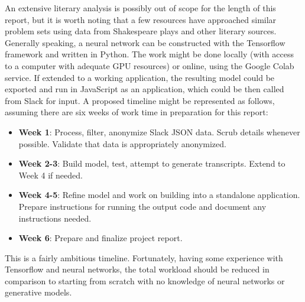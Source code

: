 \documentclass[11pt]{article}
\begin{document}
An extensive literary analysis is possibly out of scope for the length of this report, but it is worth noting that a few resources have approached similar problem sets using data from Shakespeare plays and other literary sources.
Generally speaking, a neural network can be constructed with the Tensorflow framework and written in Python.
The work might be done locally (with access to a computer with adequate GPU resources) or online, using the Google Colab service.
If extended to a working application, the resulting model could be exported and run in JavaScript as an application, which could be then called from Slack for input.
A proposed timeline might be represented as follows, assuming there are six weeks of work time in preparation for this report:
\begin{itemize}
    \item \textbf{Week 1}: Process, filter, anonymize Slack JSON data. Scrub details whenever possible. Validate that data is appropriately anonymized.
    \item \textbf{Week 2-3}: Build model, test, attempt to generate transcripts. Extend to Week 4 if needed.
    \item \textbf{Week 4-5}: Refine model and work on building into a standalone application. Prepare instructions for running the output code and document any instructions needed.
    \item \textbf{Week 6}: Prepare and finalize project report.
\end{itemize}

This is a fairly ambitious timeline.
Fortunately, having some experience with Tensorflow and neural networks, the total workload should be reduced in comparison to starting from scratch with no knowledge of neural networks or generative models.



\end{document}
